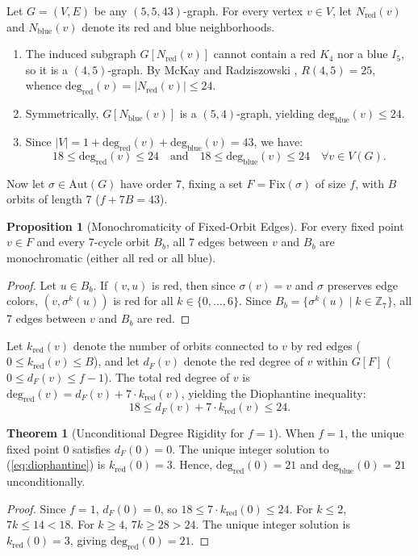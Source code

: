 \documentclass[11pt,a4paper]{article}
\theoremstyle{definition}
\newtheorem{theorem}{Theorem}
\newtheorem{proposition}{Proposition}
\begin{document}
Let $G = (V, E)$ be any $(5,5,43)$-graph. For every vertex $v \in V$, let $N_{\text{red}}(v)$ and $N_{\text{blue}}(v)$ denote its red and blue neighborhoods.
\begin{enumerate}
    \item The induced subgraph $G[N_{\text{red}}(v)]$ cannot contain a red $K_4$ nor a blue $I_5$, so it is a $(4,5)$-graph. By McKay and Radziszowski \cite{mckay1995}, $R(4,5) = 25$, whence $\text{deg}_{\text{red}}(v) = |N_{\text{red}}(v)| \le 24$.
    \item Symmetrically, $G[N_{\text{blue}}(v)]$ is a $(5,4)$-graph, yielding $\text{deg}_{\text{blue}}(v) \le 24$.
    \item Since $|V| = 1 + \text{deg}_{\text{red}}(v) + \text{deg}_{\text{blue}}(v) = 43$, we have:
    \[
    18 \le \text{deg}_{\text{red}}(v) \le 24 \quad \text{and} \quad 18 \le \text{deg}_{\text{blue}}(v) \le 24 \quad \forall v \in V(G).
    \]
\end{enumerate}

Now let $\sigma \in \text{Aut}(G)$ have order 7, fixing a set $F = \text{Fix}(\sigma)$ of size $f$, with $B$ orbits of length 7 ($f + 7B = 43$).

\begin{proposition}[Monochromaticity of Fixed-Orbit Edges]
For every fixed point $v \in F$ and every 7-cycle orbit $B_b$, all 7 edges between $v$ and $B_b$ are monochromatic (either all red or all blue).
\end{proposition}
\begin{proof}
Let $u \in B_b$. If $(v, u)$ is red, then since $\sigma(v) = v$ and $\sigma$ preserves edge colors, $(v, \sigma^k(u))$ is red for all $k \in \{0, \dots, 6\}$. Since $B_b = \{\sigma^k(u) \mid k \in \mathbb{Z}_7\}$, all 7 edges between $v$ and $B_b$ are red.
\end{proof}

Let $k_{\text{red}}(v)$ denote the number of orbits connected to $v$ by red edges ($0 \le k_{\text{red}}(v) \le B$), and let $d_F(v)$ denote the red degree of $v$ within $G[F]$ ($0 \le d_F(v) \le f - 1$). The total red degree of $v$ is $\text{deg}_{\text{red}}(v) = d_F(v) + 7 \cdot k_{\text{red}}(v)$, yielding the Diophantine inequality:
\begin{equation}
18 \le d_F(v) + 7 \cdot k_{\text{red}}(v) \le 24.
\label{eq:diophantine}
\end{equation}
\begin{theorem}[Unconditional Degree Rigidity for $f=1$]
\label{thm:degree_rigidity}
When $f=1$, the unique fixed point $0$ satisfies $d_F(0) = 0$. The unique integer solution to (\ref{eq:diophantine}) is $k_{\text{red}}(0) = 3$. Hence, $\text{deg}_{\text{red}}(0) = 21$ and $\text{deg}_{\text{blue}}(0) = 21$ unconditionally.
\end{theorem}
\begin{proof}
Since $f=1$, $d_F(0) = 0$, so $18 \le 7 \cdot k_{\text{red}}(0) \le 24$. For $k \le 2$, $7k \le 14 < 18$. For $k \ge 4$, $7k \ge 28 > 24$. The unique integer solution is $k_{\text{red}}(0) = 3$, giving $\text{deg}_{\text{red}}(0) = 21$.
\end{proof}
\end{document}
